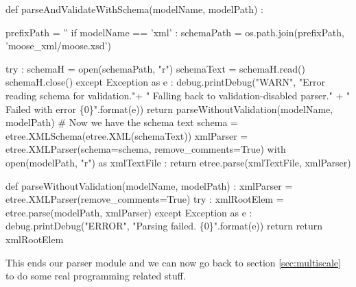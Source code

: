 \documentclass[]{article}%
\begin{document}

\nwenddocs{}\plusendmoddef\nwstartdeflinemarkup{}\nwenddeflinemarkup
def parseAndValidateWithSchema(modelName, modelPath) :
    
    prefixPath = ''
    if modelName == 'xml' :
      schemaPath = os.path.join(prefixPath, 'moose_xml/moose.xsd')

    try :
      schemaH = open(schemaPath, "r")
      schemaText = schemaH.read()
      schemaH.close()
    except Exception as e :
      debug.printDebug("WARN", "Error reading schema for validation."+
        " Falling back to validation-disabled parser."
        + " Failed with error \{0\}".format(e))
      return parseWithoutValidation(modelName, modelPath)
    # Now we have the schema text 
    schema = etree.XMLSchema(etree.XML(schemaText))
    xmlParser = etree.XMLParser(schema=schema, remove_comments=True)
    with open(modelPath, "r") as xmlTextFile :
        return etree.parse(xmlTextFile, xmlParser)

\eatline
{}\nwendcode{}\nwdocspar
\nwenddocs{}\plusendmoddef\nwstartdeflinemarkup{}\nwenddeflinemarkup
def parseWithoutValidation(modelName, modelPath) :
    xmlParser = etree.XMLParser(remove_comments=True)
    try :
      xmlRootElem = etree.parse(modelPath, xmlParser)
    except Exception as e :
      debug.printDebug("ERROR", "Parsing failed. \{0\}".format(e))
      return 
    return xmlRootElem 

\eatline
{}\nwendcode{}\nwdocspar
This ends our parser module and we can now go back to section
\ref{sec:multiscale} to do some real programming related stuff.
\end{document}
